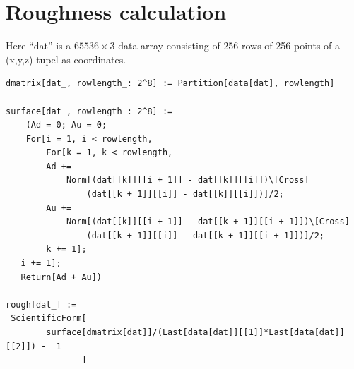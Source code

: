 \section{Roughness calculation}
\label{roughness}
Here ``dat'' is a $65536 \times 3$ data array consisting of 256 rows of 256 
points of a (x,y,z) tupel as coordinates.

\scriptsize
\lstset{language=Mathematica}

\begin{lstlisting}
dmatrix[dat_, rowlength_: 2^8] := Partition[data[dat], rowlength]

surface[dat_, rowlength_: 2^8] := 
    (Ad = 0; Au = 0;
    For[i = 1, i < rowlength,
   	    For[k = 1, k < rowlength,
        Ad += 
            Norm[(dat[[k]][[i + 1]] - dat[[k]][[i]])\[Cross]
                (dat[[k + 1]][[i]] - dat[[k]][[i]])]/2;
        Au += 
            Norm[(dat[[k]][[i + 1]] - dat[[k + 1]][[i + 1]])\[Cross]
                (dat[[k + 1]][[i]] - dat[[k + 1]][[i + 1]])]/2; 
        k += 1];
   i += 1]; 
   Return[Ad + Au])

rough[dat_] := 
 ScientificForm[
        surface[dmatrix[dat]]/(Last[data[dat]][[1]]*Last[data[dat]][[2]]) -  1
               ]

\end{lstlisting}
